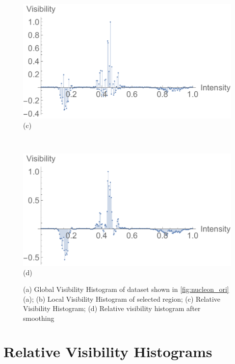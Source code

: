 \documentclass[twoside,twocolumn,10pt]{article}
\begin{document}
\begin{figure}
\begin{minipage}{.155\textwidth}
		\label{fig:local_visibility_histogram}
	\end{minipage}
	\begin{minipage}{.155\textwidth}
		\centering
		\includegraphics[width=1\linewidth]{relative_visibility_histogram}
		(c) %
		\label{fig:relative_visibility_histogram}
	\end{minipage}~
	\begin{minipage}{.155\textwidth}
		\centering
		\includegraphics[width=1\linewidth]{relative_visibility_histogram_with_gaussian}
		(d) %
		\label{fig:relative_visibility_histogram_with_gaussian}
	\end{minipage}
	\caption{(a) Global Visibility Histogram of dataset shown in \autoref{fig:nucleon_ori}(a); (b) Local Visibility Histogram of selected region; (c) Relative Visibility Histogram; (d) Relative visibility histogram after smoothing}
	\label{fig:nucleon_hist}
\end{figure}

\section{Relative Visibility Histograms}
\end{document}
